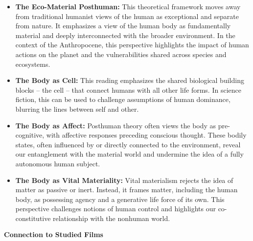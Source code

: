 \documentclass[11pt,fleqn]{book} %
\begin{document}
\begin{itemize}
\item \textbf{The Eco-Material Posthuman:} This theoretical framework moves away from traditional humanist views of the human as exceptional and separate from nature. It emphasizes a view of the human body as fundamentally material and deeply interconnected with the broader environment. In the context of the Anthropocene, this perspective highlights the impact of human actions on the planet and the vulnerabilities shared across species and ecosystems.

\item \textbf{The Body as Cell:} This reading emphasizes the shared biological building blocks – the cell – that connect humans with all other life forms. In science fiction, this can be used to challenge assumptions of human dominance, blurring the lines between self and other.

\item \textbf{The Body as Affect:} Posthuman theory often views the body as pre-cognitive, with affective responses preceding conscious thought. These bodily states, often influenced by or directly connected to the environment, reveal our entanglement with the material world and undermine the idea of a fully autonomous human subject.  

\item \textbf{The Body as Vital Materiality:} Vital materialism rejects the idea of matter as passive or inert. Instead, it frames matter, including the human body, as possessing agency and a generative life force of its own. This perspective challenges notions of human control and highlights our co-constitutive relationship with the nonhuman world.
\end{itemize}

\vspace{5pt}
\textbf{Connection to Studied Films}
\end{document}
